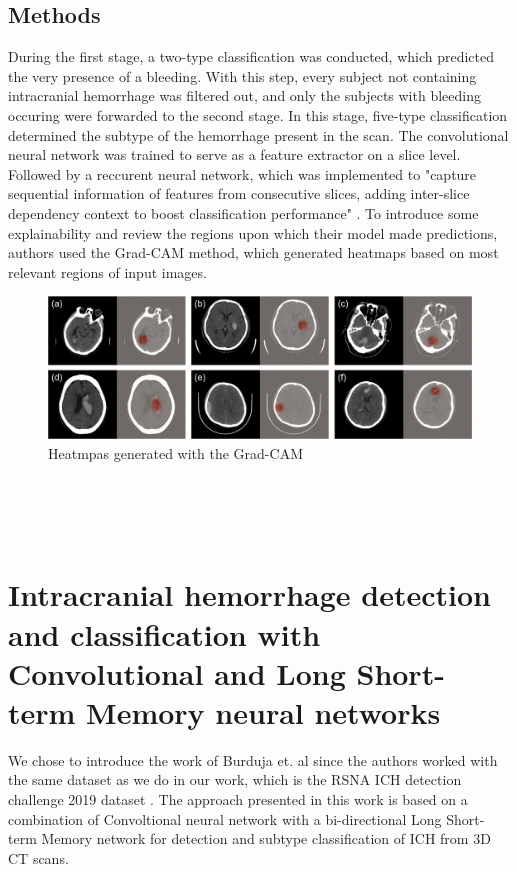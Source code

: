 \subsection*{Methods}
During the first stage, a two-type classification was conducted, which predicted the very presence of a bleeding. With this step, every subject not containing intracranial hemorrhage was filtered out, and only the subjects with bleeding occuring were forwarded to the second stage. In this stage, five-type classification determined the subtype of the hemorrhage present in the scan. The convolutional neural network was trained to serve as a feature extractor on a slice level. Followed by a reccurent neural network, which was implemented to "capture sequential information of features from consecutive slices, adding inter-slice dependency context to boost classification performance" \cite{relatedWork2}. To introduce some explainability and review the regions upon which their model made predictions, authors used the Grad-CAM method, which generated heatmaps based on most relevant regions of input images.
\begin{figure}[!ht]
\begin{centering}
\includegraphics[width=15cm]{assets/images/RW2.jpg}
\par\end{centering}
\caption[Heatmpas generated with the Grad-CAM]{Heatmpas generated with the Grad-CAM  \label{fig:rw2}}
\end{figure}
\\
\\
\\
\section{Intracranial hemorrhage detection and classification with Convolutional and Long Short-term Memory neural networks}
We chose to introduce the work of Burduja et. al \cite{relatedWork3} since the authors worked with the same dataset as we do in our work, which is the RSNA ICH detection challenge 2019 dataset \cite{RSNAchallenge}. The approach presented in this work is based on a combination of Convoltional neural network with a bi-directional Long Short-term Memory network for detection and subtype classification of ICH from 3D CT scans.
